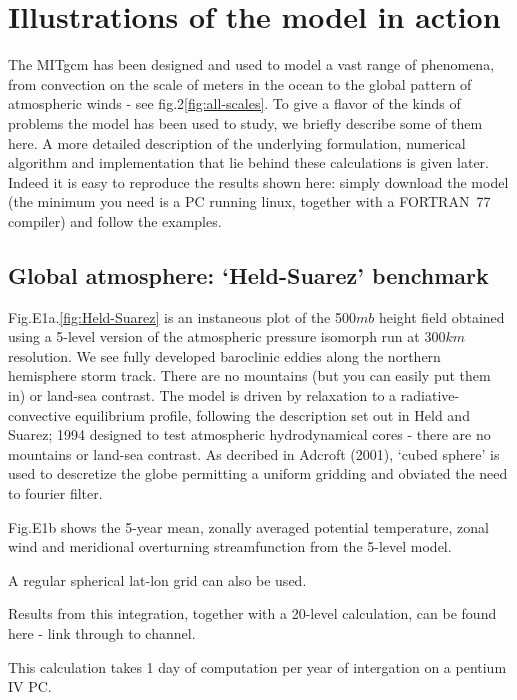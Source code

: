 
\section{Illustrations of the model in action}

The MITgcm has been designed and used to model a vast range of phenomena,
from convection on the scale of meters in the ocean to the global pattern of
atmospheric winds - see fig.2\ref{fig:all-scales}. To give a flavor of the
kinds of problems the model has been used to study, we briefly describe some
of them here. A more detailed description of the underlying formulation,
numerical algorithm and implementation that lie behind these calculations is
given later. Indeed it is easy to reproduce the results shown here: simply
download the model (the minimum you need is a PC running linux, together
with a FORTRAN\ 77 compiler) and follow the examples.

\subsection{Global atmosphere: `Held-Suarez' benchmark}

Fig.E1a.\ref{fig:Held-Suarez} is an instaneous plot of the 500$mb$ height
field obtained using a 5-level version of the atmospheric pressure isomorph
run at 300$km$ resolution. We see fully developed baroclinic eddies along
the northern hemisphere storm track. There are no mountains (but you can
easily put them in) or land-sea contrast. The model is driven by relaxation
to a radiative-convective equilibrium profile, following the description set
out in Held and Suarez; 1994 designed to test atmospheric hydrodynamical
cores - there are no mountains or land-sea contrast. As decribed in Adcroft
(2001), `cubed sphere' is used to descretize the globe permitting a uniform
gridding and obviated the need to fourier filter.

Fig.E1b shows the 5-year mean, zonally averaged potential temperature, zonal
wind and meridional overturning streamfunction from the 5-level model.

A regular spherical lat-lon grid can also be used.

Results from this integration, together with a 20-level calculation, can be
found here - link through to channel.

This calculation takes 1 day of computation per year of intergation on a
pentium IV PC.

